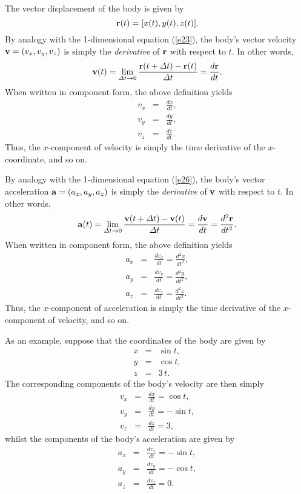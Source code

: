 The vector displacement of the body is given by
\begin{equation}
{\bf r}(t) = [x(t), y(t), z(t)].
\end{equation}
By analogy with the 1-dimensional equation (\ref{e23}), the body's
vector velocity ${\bf v}=(v_x,v_y,v_z)$ is simply the {\em derivative} of ${\bf r}$ with respect to
$t$. In other words,
\begin{equation}
{\bf v}(t) = \lim_{{\mit\Delta} t\rightarrow 0}\frac{{\bf r}(t+{\mit\Delta} t)-{\bf r}(t)}{
{\mit\Delta} t} = \frac{d{\bf r}}{dt}.
\end{equation} 
When written in component form, the above definition yields
\begin{eqnarray}
v_x &=& \frac{dx}{dt},\\
v_y &=& \frac{dy}{dt},\\
v_z &=& \frac{dz}{dt}.
\end{eqnarray}
Thus, the $x$-component of velocity is simply the time derivative of the $x$-coordinate,
and so on.

By analogy with the 1-dimensional equation (\ref{e26}), the body's
vector acceleration ${\bf a}=(a_x,a_y,a_z)$ is simply the {\em derivative} of ${\bf v}$ with respect to
$t$. In other words,
\begin{equation}
{\bf a}(t) = \lim_{{\mit\Delta} t\rightarrow 0}\frac{{\bf v}(t+{\mit\Delta} t)-{\bf v}(t)}{
{\mit\Delta} t} = \frac{d{\bf v}}{dt}=\frac{d^2{\bf r}}{dt^2}.
\end{equation} 
When written in component form, the above definition yields
\begin{eqnarray}
a_x &=& \frac{dv_x}{dt}=\frac{d^2 x}{dt^2},\\
a_y &=& \frac{dv_y}{dt}=\frac{d^2 y}{dt^2},\\
a_z &=& \frac{dv_z}{dt}=\frac{d^2 z}{dt^2}.
\end{eqnarray}
Thus, the $x$-component of acceleration is simply the time derivative
of the $x$-component of velocity, and so on.

As an example, suppose that the coordinates of the body are given by
\begin{eqnarray}
x &=& \sin t,\\
y &=& \cos t,\\
z &=& 3\,t.
\end{eqnarray}
The corresponding components of the body's velocity are then simply
 \begin{eqnarray}
v_x &=& \frac{dx}{dt}=\cos t,\\
v_y &=&\frac{dy}{dt}= - \sin t,\\
v_z &=& \frac{dz}{dt}=3,
\end{eqnarray}
whilst the components of the body's acceleration are given by 
\begin{eqnarray}
a_x &=& \frac{dv_x}{dt}=-\sin t,\\
a_y &=& \frac{dv_y}{dt}=- \cos t,\\
a_z &=& \frac{dv_z}{dt}=0.
\end{eqnarray}


